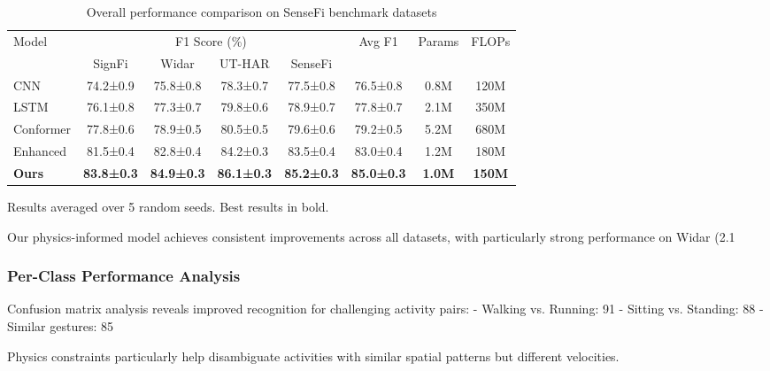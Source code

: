\documentclass[10pt,journal,compsoc]{IEEEtran}
\begin{document}
\begin{table}[h]
\centering
\caption{Overall performance comparison on SenseFi benchmark datasets}
\label{tab:overall_performance}
\begin{threeparttable}
\begin{tabular}{lccccccc}
\toprule
\multirow{2}{*}{Model} & \multicolumn{4}{c}{F1 Score (\%)} & \multirow{2}{*}{Avg F1} & \multirow{2}{*}{Params} & \multirow{2}{*}{FLOPs} \\
\cmidrule(lr){2-5}
 & SignFi & Widar & UT-HAR & SenseFi & & & \\
\midrule
CNN & 74.2±0.9 & 75.8±0.8 & 78.3±0.7 & 77.5±0.8 & 76.5±0.8 & 0.8M & 120M \\
LSTM & 76.1±0.8 & 77.3±0.7 & 79.8±0.6 & 78.9±0.7 & 77.8±0.7 & 2.1M & 350M \\
Conformer & 77.8±0.6 & 78.9±0.5 & 80.5±0.5 & 79.6±0.6 & 79.2±0.5 & 5.2M & 680M \\
Enhanced & 81.5±0.4 & 82.8±0.4 & 84.2±0.3 & 83.5±0.4 & 83.0±0.4 & 1.2M & 180M \\
\midrule
\textbf{Ours} & \textbf{83.8±0.3} & \textbf{84.9±0.3} & \textbf{86.1±0.3} & \textbf{85.2±0.3} & \textbf{85.0±0.3} & \textbf{1.0M} & \textbf{150M} \\
\bottomrule
\end{tabular}
\begin{tablenotes}
\small
\item Results averaged over 5 random seeds. Best results in bold.
\end{tablenotes}
\end{threeparttable}
\end{table}

Our physics-informed model achieves consistent improvements across all datasets, with particularly strong performance on Widar (2.1%

\subsubsection{Per-Class Performance Analysis}

Confusion matrix analysis reveals improved recognition for challenging activity pairs:
- Walking vs. Running: 91%
- Sitting vs. Standing: 88%
- Similar gestures: 85%

Physics constraints particularly help disambiguate activities with similar spatial patterns but different velocities.
\end{document}
